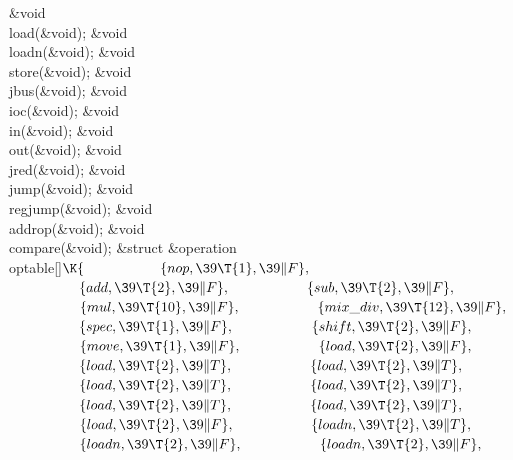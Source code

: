 \&{void} \\{load}(\&{void});\6
\&{void} \\{loadn}(\&{void});\6
\&{void} \\{store}(\&{void});\6
\&{void} \\{jbus}(\&{void});\6
\&{void} \\{ioc}(\&{void});\6
\&{void} \\{in}(\&{void});\6
\&{void} \\{out}(\&{void});\6
\&{void} \\{jred}(\&{void});\6
\&{void} \\{jump}(\&{void});\6
\&{void} \\{regjump}(\&{void});\6
\&{void} \\{addrop}(\&{void});\6
\&{void} \\{compare}(\&{void});\6
\&{struct} \&{operation} \\{optable}[]${}\K\{{}$\6
${}\hbox{\>}\{\\{nop},\39\T{1},\39\|F\},{}$\6
${}\hbox{\>}\{\\{add},\39\T{2},\39\|F\},{}$\6
${}\hbox{\>}\{\\{sub},\39\T{2},\39\|F\},{}$\6
${}\hbox{\>}\{\\{mul},\39\T{10},\39\|F\},{}$\6
${}\hbox{\>}\{\\{mix\_div},\39\T{12},\39\|F\},{}$\6
${}\hbox{\>}\{\\{spec},\39\T{1},\39\|F\},{}$\6
${}\hbox{\>}\{\\{shift},\39\T{2},\39\|F\},{}$\6
${}\hbox{\>}\{\\{move},\39\T{1},\39\|F\},{}$\6
${}\hbox{\>}\{\\{load},\39\T{2},\39\|F\},{}$\6
${}\hbox{\>}\{\\{load},\39\T{2},\39\|T\},{}$\6
${}\hbox{\>}\{\\{load},\39\T{2},\39\|T\},{}$\6
${}\hbox{\>}\{\\{load},\39\T{2},\39\|T\},{}$\6
${}\hbox{\>}\{\\{load},\39\T{2},\39\|T\},{}$\6
${}\hbox{\>}\{\\{load},\39\T{2},\39\|T\},{}$\6
${}\hbox{\>}\{\\{load},\39\T{2},\39\|T\},{}$\6
${}\hbox{\>}\{\\{load},\39\T{2},\39\|F\},{}$\6
${}\hbox{\>}\{\\{loadn},\39\T{2},\39\|T\},{}$\6
${}\hbox{\>}\{\\{loadn},\39\T{2},\39\|F\},{}$\6
${}\hbox{\>}\{\\{loadn},\39\T{2},\39\|F\},{}$\6
